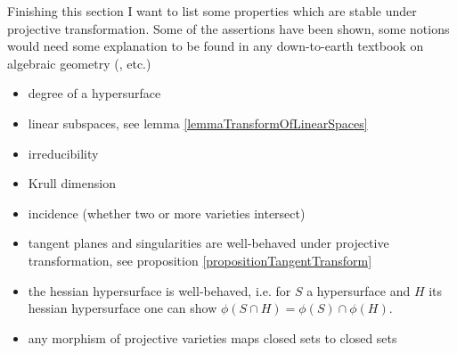Finishing this section I want to list some properties which are stable under projective transformation.
Some of the assertions have been shown, some notions would need some explanation to be found in any down-to-earth textbook on algebraic geometry (\cite{shafarevich1994basic, harris1992algebraic, brieskorn2012plane}, etc.)
\begin{itemize}
\item degree of a hypersurface
\item linear subspaces, see lemma \ref{lemmaTransformOfLinearSpaces}
\item irreducibility
\item Krull dimension
\item incidence (whether two or more varieties intersect)
\item tangent planes and singularities are well-behaved under projective transformation, see proposition \ref{propositionTangentTransform}
\item the hessian hypersurface is well-behaved, i.e. for $S$ a hypersurface and $H$ its hessian hypersurface one can show $\phi(S \cap H) = \phi(S) \cap \phi(H)$.
\item any morphism of projective varieties maps closed sets to closed sets \cite[theorem 1.10]{shafarevich1994basic}
\end{itemize}

